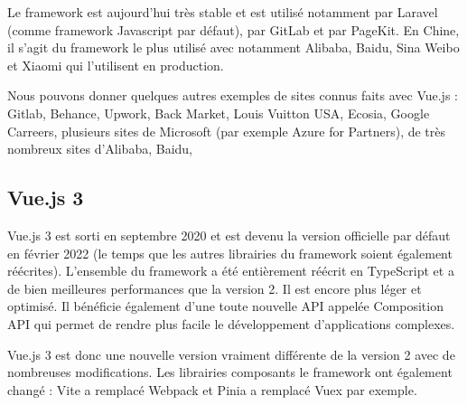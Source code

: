 Le framework est aujourd'hui très stable et est utilisé notamment par {\color{monOrange}Laravel} (comme framework {\color{monOrange}Javascript} par défaut), par {\color{monOrange}GitLab} et par {\color{monOrange}PageKit}. En Chine, il s'agit du framework le plus utilisé avec notamment {\color{monOrange}Alibaba}, {\color{monOrange}Baidu}, {\color{monOrange}Sina Weibo} et {\color{monOrange}Xiaomi} qui l'utilisent en production.

Nous pouvons donner quelques autres exemples de sites connus faits avec {\color{monOrange}Vue.js} : {\color{monOrange}Gitlab, Behance, Upwork, Back Market, Louis Vuitton USA, Ecosia, Google Carreers}, plusieurs sites de {\color{monOrange}Microsoft} (par exemple {\color{monOrange}Azure for Partners}), de très nombreux sites d'{\color{monOrange}Alibaba, Baidu},

\subsection{Vue.js 3}
{\color{monOrange}Vue.js 3} est sorti en septembre 2020 et est devenu la version officielle par défaut en février 2022 (le temps que les autres librairies du framework soient également réécrites). L'ensemble du framework a été entièrement réécrit en {\color{monOrange}TypeScript} et a de bien meilleures performances que la version 2. Il est encore plus léger et optimisé. Il bénéficie également d'une toute nouvelle API appelée {\color{monOrange}Composition API} qui permet de rendre plus facile le développement d'applications complexes.

{\color{monOrange}Vue.js 3} est donc une nouvelle version vraiment différente de la version 2 avec de nombreuses modifications. Les librairies composants le framework ont également changé : {\color{monOrange}Vite} a remplacé {\color{monOrange}Webpack} et {\color{monOrange}Pinia} a remplacé {\color{monOrange}Vuex} par exemple.


